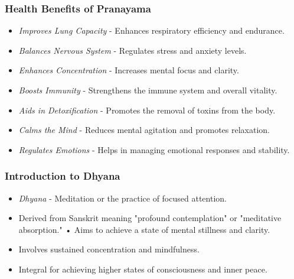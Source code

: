 \begin{frame}[fragile]\frametitle{Health Benefits of Pranayama}

      \begin{itemize}
		\item \textit{Improves Lung Capacity} - Enhances respiratory efficiency and endurance.
		\item \textit{Balances Nervous System} - Regulates stress and anxiety levels.
		\item \textit{Enhances Concentration} - Increases mental focus and clarity.
		\item \textit{Boosts Immunity} - Strengthens the immune system and overall vitality.
		\item \textit{Aids in Detoxification} - Promotes the removal of toxins from the body.
		\item \textit{Calms the Mind} - Reduces mental agitation and promotes relaxation.
		\item \textit{Regulates Emotions} - Helps in managing emotional responses and stability.
	  \end{itemize}

\end{frame}

\begin{frame}[fragile]\frametitle{Introduction to Dhyana}

      \begin{itemize}
		\item \textit{Dhyana} - Meditation or the practice of focused attention.
		\item Derived from Sanskrit meaning "profound contemplation" or "meditative absorption."
		• Aims to achieve a state of mental stillness and clarity.
		\item Involves sustained concentration and mindfulness.
		\item Integral for achieving higher states of consciousness and inner peace.
	  \end{itemize}

\end{frame}


